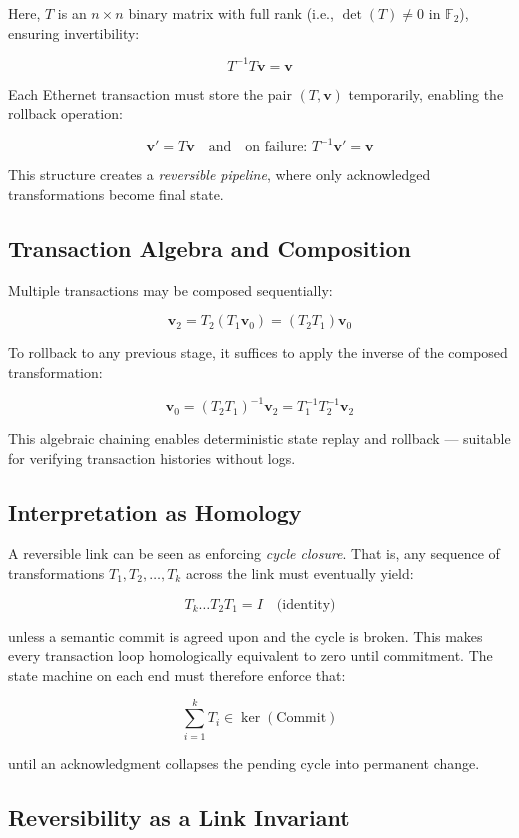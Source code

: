 Here, $T$ is an $n \times n$ binary matrix with full rank (i.e., $\det(T) \ne 0$ in $\mathbb{F}_2$), ensuring invertibility:

\[
T^{-1}T\mathbf{v} = \mathbf{v}
\]

Each Ethernet transaction must store the pair $(T, \mathbf{v})$ temporarily, enabling the rollback operation:

\[
\mathbf{v}' = T\mathbf{v} \quad \text{and} \quad \text{on failure: } T^{-1}\mathbf{v}' = \mathbf{v}
\]

This structure creates a \emph{reversible pipeline}, where only acknowledged transformations become final state.

\subsection*{Transaction Algebra and Composition}

Multiple transactions may be composed sequentially:

\[
\mathbf{v}_2 = T_2(T_1\mathbf{v}_0) = (T_2T_1)\mathbf{v}_0
\]

To rollback to any previous stage, it suffices to apply the inverse of the composed transformation:

\[
\mathbf{v}_0 = (T_2T_1)^{-1}\mathbf{v}_2 = T_1^{-1}T_2^{-1}\mathbf{v}_2
\]

This algebraic chaining enables deterministic state replay and rollback — suitable for verifying transaction histories without logs.

\subsection*{Interpretation as Homology}

A reversible link can be seen as enforcing \emph{cycle closure}. That is, any sequence of transformations $T_1, T_2, \dots, T_k$ across the link must eventually yield:

\[
T_k \dots T_2 T_1 = I \quad \text{(identity)}
\]

unless a semantic commit is agreed upon and the cycle is broken. This makes every transaction loop homologically equivalent to zero until commitment. The state machine on each end must therefore enforce that:

\[
\sum_{i=1}^k T_i \in \ker(\text{Commit})
\]

until an acknowledgment collapses the pending cycle into permanent change.

\subsection*{Reversibility as a Link Invariant}

